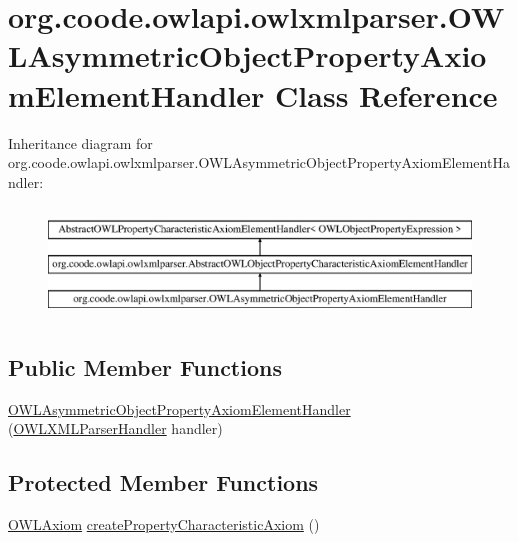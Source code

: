 \hypertarget{classorg_1_1coode_1_1owlapi_1_1owlxmlparser_1_1_o_w_l_asymmetric_object_property_axiom_element_handler}{\section{org.\-coode.\-owlapi.\-owlxmlparser.\-O\-W\-L\-Asymmetric\-Object\-Property\-Axiom\-Element\-Handler Class Reference}
\label{classorg_1_1coode_1_1owlapi_1_1owlxmlparser_1_1_o_w_l_asymmetric_object_property_axiom_element_handler}
}
Inheritance diagram for org.\-coode.\-owlapi.\-owlxmlparser.\-O\-W\-L\-Asymmetric\-Object\-Property\-Axiom\-Element\-Handler\-:\begin{figure}[H]
\begin{center}
\leavevmode
\includegraphics[height=2.984014cm]{classorg_1_1coode_1_1owlapi_1_1owlxmlparser_1_1_o_w_l_asymmetric_object_property_axiom_element_handler}
\end{center}
\end{figure}
\subsection*{Public Member Functions}
\begin{DoxyCompactItemize}
\item 
\hyperlink{classorg_1_1coode_1_1owlapi_1_1owlxmlparser_1_1_o_w_l_asymmetric_object_property_axiom_element_handler_a9b1979d4b29fd7c3865de6f15b0ceda3}{O\-W\-L\-Asymmetric\-Object\-Property\-Axiom\-Element\-Handler} (\hyperlink{classorg_1_1coode_1_1owlapi_1_1owlxmlparser_1_1_o_w_l_x_m_l_parser_handler}{O\-W\-L\-X\-M\-L\-Parser\-Handler} handler)
\end{DoxyCompactItemize}
\subsection*{Protected Member Functions}
\begin{DoxyCompactItemize}
\item 
\hyperlink{interfaceorg_1_1semanticweb_1_1owlapi_1_1model_1_1_o_w_l_axiom}{O\-W\-L\-Axiom} \hyperlink{classorg_1_1coode_1_1owlapi_1_1owlxmlparser_1_1_o_w_l_asymmetric_object_property_axiom_element_handler_af29b9427710c0f94a0cff4bae9ffda6f}{create\-Property\-Characteristic\-Axiom} ()
\end{DoxyCompactItemize}


